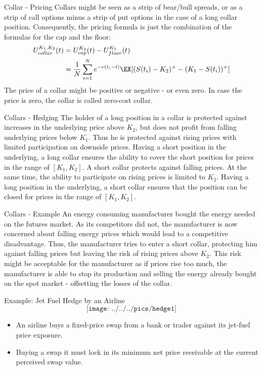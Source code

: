 {Collar - Pricing}
Collars might be seen as a strip of bear/bull spreads, or as a strip of call options minus a strip of put options in the case of a long collar position. Consequently, the pricing formula is just the combination of the formulas for the cap and the floor:
\begin{align*}
	U^{K_1, K_2}_{collar}(t)&=U^{K_2}_{cap}(t)-U^{K_1}_{floor}(t)\\
	&=\frac{1}{N}\sum_{i=1}^Ne^{-r(t_i-t)}\EX[(S(t_i)-K_2)^+ - (K_1-S(t_i))^+]
\end{align*}
The price of a collar might be positive or negative - or even zero. In case the price is zero, the collar is called zero-cost collar.



{Collars - Hedging}
The holder of a long position in a collar is protected against increases in the underlying price above $K_2$, but does not profit from falling underlying prices below $K_1$. Thus he is protected against rising prices with limited participation on downside prices. Having a short position in the underlying, a long collar ensures the ability to cover the short position for prices in the range of $[K_1, K_2]$.
A short collar protects against falling prices. At the same time, the ability to participate on rising prices is limited to $K_2$. Having a long position in the underlying, a short collar ensures that the position can be closed for prices in the range of $[K_1, K_2]$.



{Collars - Example}
An energy consuming manufacturer bought the energy needed on the futures market. As its competitors did not, the manufacturer is now concerned about falling energy prices which would lead to a competitive disadvantage. Thus, the manufacturer tries to enter a short collar, protecting him against falling prices but leaving the risk of rising prices above $K_2$. This risk might be acceptable for the manufacturer as if prices rise too much, the manufacturer is able to stop its production and selling the energy already bought on the spot market - offsetting the losses of the collar.




{Example: Jet Fuel Hedge by an Airline}
\vspace{-0.4cm}
$$\texttt{[image: ../../../pics/hedge1]}$$
\vspace{-0.7cm}
\begin{itemize}
  \item An airline buys a fixed-price swap from a bank or trader against its jet-fuel price exposure.
  \item Buying a swap it must lock in its minimum net price receivable at the current perceived swap value.
\end{itemize}



